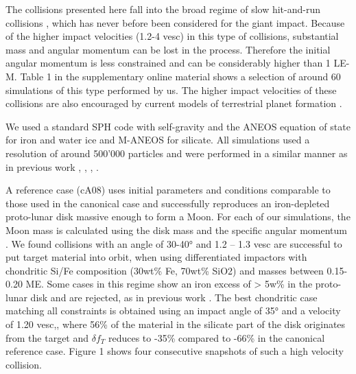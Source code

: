 The collisions presented here fall into the broad regime of slow hit-and-run collisions \citep{Asphaug:2006p3729}, which has never before been considered for the giant impact. Because of the higher impact velocities (1.2-4 vesc) in this type of collisions, substantial mass and angular momentum can be lost in the process. Therefore the initial angular momentum is less constrained and can be considerably higher than 1 LE-M. Table 1 in the supplementary online material shows a selection of around 60 simulations of this type performed by us. The higher impact velocities of these collisions are also encouraged by current models of terrestrial planet formation  \citep{2006Icar..184...39O}. 

We used a standard SPH code with self-gravity and the ANEOS equation of state  \citep{1972Thompson} for iron and water ice and M-ANEOS  \citep{Melosh:2007p3502} for silicate. All simulations used a resolution of around 500'000 particles and were performed in a similar manner as in previous work \citep{Benz:1985p1755},  \citep{Canup:2001p1861},  \citep{Canup:2001p3295},  \citep{Canup:2004p115}. 

A reference case (cA08) uses initial parameters and conditions comparable to those used in the canonical case \citep{Canup:2004p115} and successfully reproduces an iron-depleted proto-lunar disk massive enough to form a Moon.  For each of our simulations, the Moon mass is calculated using the disk mass and the specific angular momentum \citep{Kokubo:2000p2195}. We found collisions with an angle of 30-40° and 1.2 – 1.3 vesc are successful to put target material into orbit, when using differentiated impactors with chondritic Si/Fe composition (30wt\% Fe, 70wt\% SiO2) and masses between 0.15-0.20 ME. Some cases in this regime show an iron excess of > 5w\% in the proto-lunar disk and are rejected, as in previous work \citep{Canup:2004p115}. The best chondritic case matching all constraints is obtained using an impact angle of 35° and a velocity of 1.20 vesc,, where 56\% of the material in the silicate part of the disk originates from the target and $\delta f_{T}$ reduces to -35\% compared to -66\% in the canonical reference case. Figure 1 shows four consecutive snapshots of such a high velocity collision.

